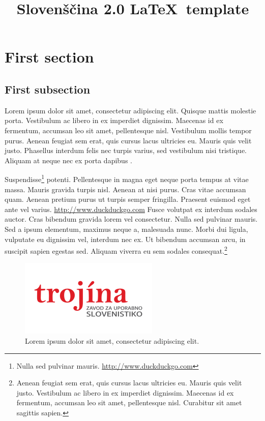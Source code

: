 \documentclass[english,georgia]{slo20}
\affiliation{%
Magic and Macaroons Lab, University of Southern Atlantis\\
The Republic, Utopia}
\affiliation{%
ACME Research Group, University of Entenhausen\\
Entenhausen, Germany}
\title{Slovenščina 2.0 \LaTeX\ template}
\begin{document}
\section{First section}

\subsection{First subsection}

Lorem ipsum dolor sit amet, consectetur adipiscing elit. Quisque mattis
molestie porta. Vestibulum ac libero in ex imperdiet dignissim. Maecenas id ex
fermentum, accumsan leo sit amet, pellentesque nisl. Vestibulum mollis tempor
purus. Aenean feugiat sem erat, quis cursus lacus ultricies eu. Mauris quis
velit justo.  Phasellus interdum felis nec turpis varius, sed vestibulum nisi
tristique. Aliquam at neque nec ex porta dapibus
\parencite{siepmann2015dictionaries}.

Suspendisse\footnote{ Nulla sed pulvinar mauris.
\url{http://www.duckduckgo.com}} potenti. Pellentesque in magna eget neque
porta tempus at vitae massa. Mauris gravida turpis nisl.  Aenean at nisi purus.
Cras vitae accumsan quam. Aenean pretium purus ut turpis semper fringilla.
Praesent euismod eget ante vel varius. \url{http://www.duckduckgo.com} Fusce
volutpat ex interdum sodales auctor.  Cras bibendum gravida lorem vel
consectetur. Nulla sed pulvinar mauris.  Sed a ipsum elementum, maximus neque
a, malesuada nunc. Morbi dui ligula, vulputate eu dignissim vel, interdum nec
ex. Ut bibendum accumsan arcu, in suscipit sapien egestas sed. Aliquam viverra
eu sem sodales consequat.\footnote{Aenean feugiat sem erat, quis cursus lacus
ultricies eu.  Mauris quis velit justo. Vestibulum ac libero in ex imperdiet
dignissim.  Maecenas id ex fermentum, accumsan leo sit amet, pellentesque nisl.
Curabitur sit amet sagittis sapien.}

\begin{figure}
\centering
\includegraphics[scale=0.75]{trojina}
\caption{%
Lorem ipsum dolor sit amet, consectetur adipiscing elit.}
\end{figure}
\end{document}
